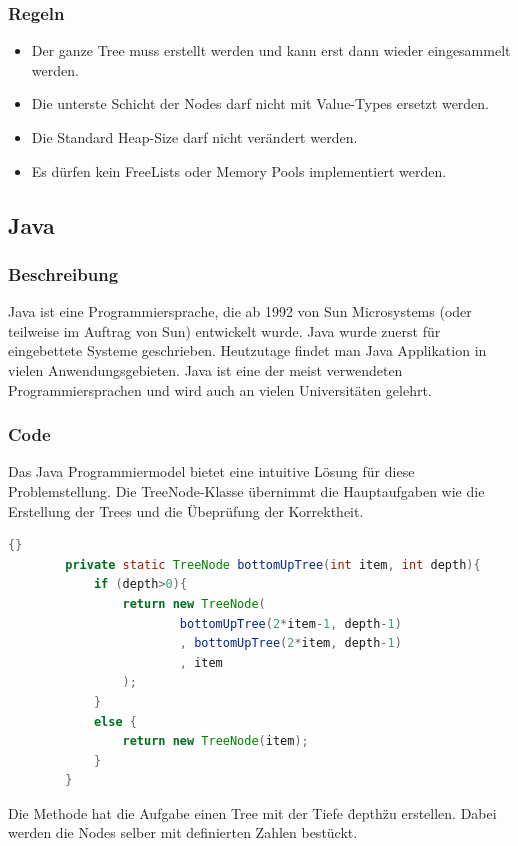 \documentclass{fancydocument}
\begin{document}
\subsubsection{Regeln}

\begin{itemize}
\item Der ganze Tree muss erstellt werden und kann erst dann wieder eingesammelt
  werden.
\item Die unterste Schicht der Nodes darf nicht mit Value-Types
  ersetzt werden.
\item Die Standard Heap-Size darf nicht ver\"andert werden.
\item Es d\"urfen kein FreeLists oder Memory Pools implementiert werden.
\end{itemize}

\subsection{Java}
\subsubsection{Beschreibung}

Java ist eine Programmiersprache, die ab 1992 von Sun Microsystems (oder
teilweise im Auftrag von Sun) entwickelt wurde. Java wurde zuerst f\"ur
eingebettete Systeme geschrieben. Heutzutage findet man Java Applikation in
vielen Anwendungsgebieten.
Java ist eine der meist verwendeten Programmiersprachen und wird auch
an vielen Universitäten gelehrt. 

\subsubsection{Code}

Das Java Programmiermodel bietet eine  intuitive L\"osung f\"ur diese
Problemstellung. Die TreeNode-Klasse \"ubernimmt die Hauptaufgaben wie
die Erstellung der Trees und die \"Ubepr\"ufung der Korrektheit.
\\
\begin{lstlisting}[language=java,caption=Tree erstelung]{}
		private static TreeNode bottomUpTree(int item, int depth){
			if (depth>0){
				return new TreeNode(
						bottomUpTree(2*item-1, depth-1)
						, bottomUpTree(2*item, depth-1)
						, item
				);
			}
			else {
				return new TreeNode(item);
			}
		}
\end{lstlisting}
		
Die Methode hat die Aufgabe einen Tree mit der Tiefe \"depth\" zu
erstellen. Dabei werden die Nodes selber mit definierten Zahlen best\"uckt. 
\end{document}
